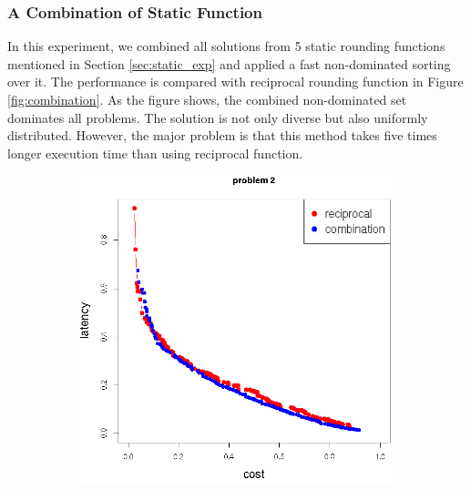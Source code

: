 \subsubsection{A Combination of Static Function}
In this experiment, we combined all solutions from 5 static rounding functions mentioned in Section \ref{sec:static_exp} and applied
a fast non-dominated sorting over it. The performance is compared with reciprocal rounding function in Figure \ref{fig:combination}.
As the figure shows, the combined non-dominated set dominates all problems. The solution is not only diverse but also uniformly distributed.
However, the major problem is that this method takes five times longer execution time than using reciprocal function.

\begin{figure}[h!]
   \centering
   \begin{subfigure}{0.49\textwidth}
       \includegraphics[width=\textwidth]{pics/combination_problem2.png}
	   \caption{}
   \end{subfigure}
   \begin{subfigure}{0.49\textwidth}

\end{subfigure}
\end{figure}

